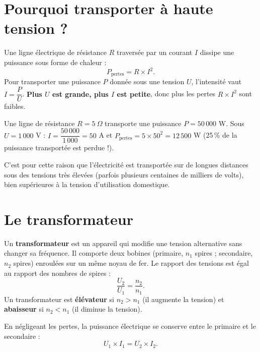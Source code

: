 \section{Pourquoi transporter à haute tension ?}

\begin{propriete}
Une ligne électrique de résistance $R$ traversée par un courant $I$ dissipe une puissance
sous forme de chaleur :
\[
P_{\text{pertes}}=R\times I^2.
\]
Pour transporter une puissance $P$ donnée sous une tension $U$, l'intensité vaut
$I=\dfrac PU$. \textbf{Plus $U$ est grande, plus $I$ est petite}, donc plus les pertes
$R\times I^2$ sont faibles.
\end{propriete}

\begin{exemple}
Une ligne de résistance $R=5\ \Omega$ transporte une puissance $P=50\,000$ W. Sous
$U=1\,000$ V : $I=\dfrac{50\,000}{1\,000}=50$ A et $P_{\text{pertes}}=5\times50^2=12\,500$
W (25\,\% de la puissance transportée est perdue !).
\end{exemple}

\begin{remarque}
C'est pour cette raison que l'électricité est transportée sur de longues distances sous
des tensions très élevées (parfois plusieurs centaines de milliers de volts), bien
supérieures à la tension d'utilisation domestique.
\end{remarque}

\section{Le transformateur}

\begin{definition}[Transformateur]
Un \textbf{transformateur} est un appareil qui modifie une tension alternative sans
changer sa fréquence. Il comporte deux bobines (primaire, $n_1$ spires ; secondaire, $n_2$
spires) enroulées sur un même noyau de fer. Le rapport des tensions est égal au rapport
des nombres de spires :
\[
\frac{U_2}{U_1}=\frac{n_2}{n_1}.
\]
Un transformateur est \textbf{élévateur} si $n_2>n_1$ (il augmente la tension) et
\textbf{abaisseur} si $n_2<n_1$ (il diminue la tension).
\end{definition}

\begin{propriete}
En négligeant les pertes, la puissance électrique se conserve entre le primaire et le
secondaire :
\[
U_1\times I_1=U_2\times I_2.
\]
\end{propriete}

